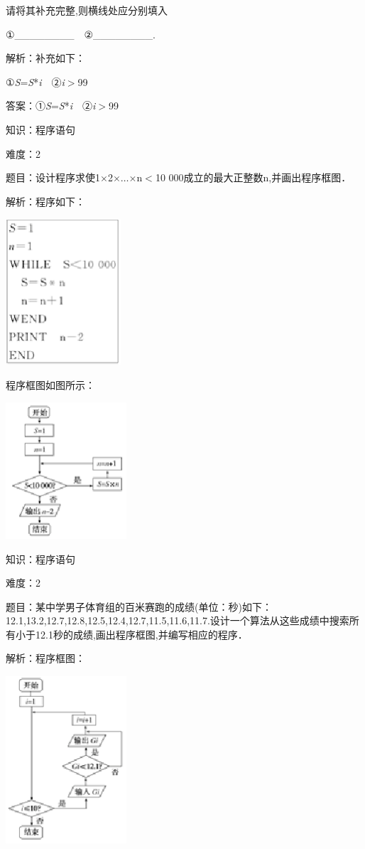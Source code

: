 \documentclass{article} %
\begin{document}
请将其补充完整,则横线处应分别填入

①\_\_\_\_\_\_\_\_　②\_\_\_\_\_\_\_\_.

解析：补充如下：

①\textit{S}=\textit{S}*\textit{i}　②\textit{i}$\mathrm{>}$99

答案：①\textit{S}=\textit{S}*\textit{i}　②\textit{i}$\mathrm{>}$99

知识：程序语句

难度：2

题目：设计程序求使1$\mathrm{\times}$2$\mathrm{\times}$$\dots$$\mathrm{\times}$n$\mathrm{<}$10 000成立的最大正整数n,并画出程序框图．

解析：程序如下：

\includegraphics*[width=1.69in, height=2.15in, keepaspectratio=false]{image72}

程序框图如图所示：

\includegraphics*[width=1.77in, height=2.00in, keepaspectratio=false]{image73}

知识：程序语句

难度：2

题目：某中学男子体育组的百米赛跑的成绩(单位：秒)如下：12.1,13.2,12.7,12.8,12.5,12.4,12.7,11.5,11.6,11.7.设计一个算法从这些成绩中搜索所有小于12.1秒的成绩,画出程序框图,并编写相应的程序．

解析：程序框图：

\includegraphics*[width=1.77in, height=2.47in, keepaspectratio=false]{image74}
\end{document}
